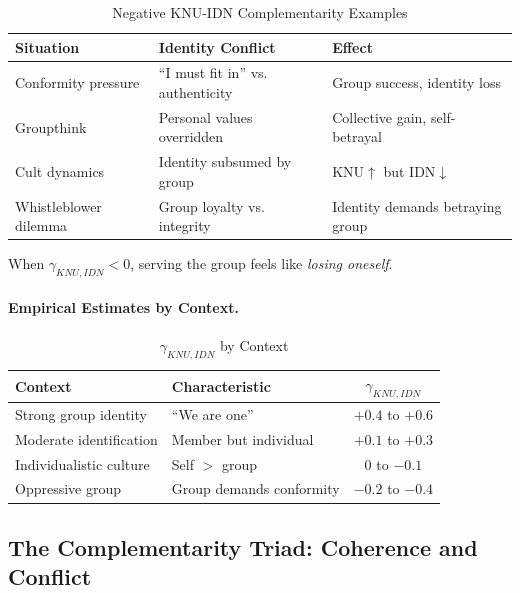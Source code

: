 \begin{table}[htbp]
\centering
\caption{Negative KNU-IDN Complementarity Examples}
\label{tab:app-c-knu-idn-negative}
\renewcommand{\arraystretch}{1.3}
\begin{tabular}{@{}lll@{}}
\toprule
\textbf{Situation} & \textbf{Identity Conflict} & \textbf{Effect} \\
\midrule
Conformity pressure & ``I must fit in'' vs. authenticity & Group success, identity loss \\
Groupthink & Personal values overridden & Collective gain, self-betrayal \\
Cult dynamics & Identity subsumed by group & KNU$\uparrow$ but IDN$\downarrow$ \\
Whistleblower dilemma & Group loyalty vs. integrity & Identity demands betraying group \\
\bottomrule
\end{tabular}
\end{table}

When $\gamma_{KNU,IDN} < 0$, serving the group feels like \emph{losing oneself}.

\paragraph{Empirical Estimates by Context.}

\begin{table}[htbp]
\centering
\caption{$\gamma_{KNU,IDN}$ by Context}
\label{tab:app-c-gamma-knu-idn-context}
\renewcommand{\arraystretch}{1.3}
\begin{tabular}{@{}llc@{}}
\toprule
\textbf{Context} & \textbf{Characteristic} & $\gamma_{KNU,IDN}$ \\
\midrule
Strong group identity & ``We are one'' & $+0.4$ to $+0.6$ \\
Moderate identification & Member but individual & $+0.1$ to $+0.3$ \\
Individualistic culture & Self $>$ group & $0$ to $-0.1$ \\
Oppressive group & Group demands conformity & $-0.2$ to $-0.4$ \\
\bottomrule
\end{tabular}
\end{table}

\subsection{The Complementarity Triad: Coherence and Conflict}

